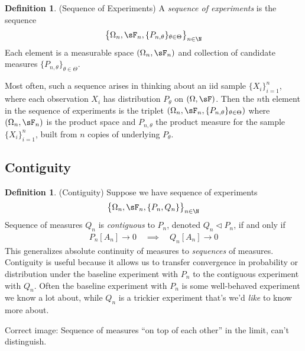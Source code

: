 \documentclass[12pt]{article}
\theoremstyle{plain}
\theoremstyle{definition}
\newtheorem{defn}[thm]{Definition}
\theoremstyle{remark}
\newcommand{\ra}{\rightarrow}
\begin{document}
\begin{defn}(Sequence of Experiments)
A \emph{sequence of experiments} is the sequence
\begin{align*}
  \big\{\Omega_n,\sF_n,\{P_{n,\theta}\}_{\theta\in  \Theta}
  \big\}_{n\in \N}
\end{align*}
Each element is a measurable space $(\Omega_n,\sF_n)$ and
collection of candidate measures $\{P_{n,\theta}\}_{\theta\in  \Theta}$.

Most often, such a sequence arises in thinking about an iid sample
$\{X_i\}_{i=1}^n$, where each observation $X_i$ has distribution $P_\theta$
on $(\Omega,\sF)$.
Then the $n$th element in the sequence of experiments is the
triplet $(\Omega_n,\sF_n,\{P_{n,\theta}\}_{\theta\in  \Theta})$ where
$(\Omega_n,\sF_n)$ is the product space and $P_{n,\theta}$ the product
measure for the sample $\{X_i\}_{i=1}^n$, built from $n$ copies of
underlying $P_\theta$.
\end{defn}


\clearpage
\subsection{Contiguity}

\begin{defn}(Contiguity)
Suppose we have sequence of experiments
\begin{align*}
  \big\{\Omega_n,\sF_n,\{P_n,Q_n\}\big\}_{n\in\N}
\end{align*}
Sequence of measures $Q_n$ is \emph{contiguous} to $P_n$, denoted $Q_n
\vartriangleleft P_n$, if and only if
\begin{align*}
  P_n[A_n]\ra 0
  \quad\implies\quad
  Q_n[A_n]\ra 0
\end{align*}
This generalizes absolute continuity of measures to \emph{sequences} of
measures.
Contiguity is useful because it allows us to transfer convergence in
probability or distribution under the baseline experiment with $P_n$ to
the contiguous experiment with $Q_n$. Often the baseline experiment with
$P_n$ is some well-behaved experiment we know a lot about, while $Q_n$
is a trickier experiment that's we'd \emph{like} to know more about.

Correct image: Sequence of measures ``on top of each other'' in the
limit, can't distinguish.
\end{defn}
\end{document}
